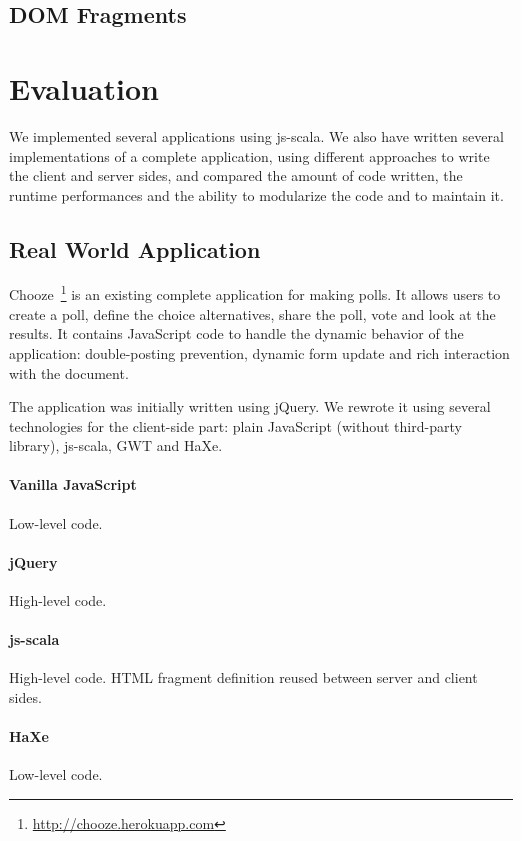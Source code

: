 \documentclass[preprint]{sigplanconf}
\begin{document}
\subsection{DOM Fragments}

\section{Evaluation}
\label{validation}

We implemented several applications using js-scala. We also have written several implementations of a complete
application, using different approaches to write the client and server sides, and compared the amount of code
written, the runtime performances and the ability to modularize the code and to maintain it.

\subsection{Real World Application}

Chooze~\footnote{\href{http://chooze.herokuapp.com}{http://chooze.herokuapp.com}} is an existing complete
application for making polls. It allows users to create a poll, define the choice alternatives, share the poll, vote
and look at the results. It contains JavaScript code to handle the dynamic behavior of the application:
double-posting prevention, dynamic form update and rich interaction with the document.

The application was initially written using jQuery. We rewrote it using several technologies for the client-side
part: plain JavaScript (without third-party library), js-scala, GWT and HaXe.

\paragraph*{Vanilla JavaScript} Low-level code.

\paragraph*{jQuery} High-level code.

\paragraph*{js-scala} High-level code. HTML fragment definition reused between server and client sides.

\paragraph*{HaXe} Low-level code.
\end{document}
